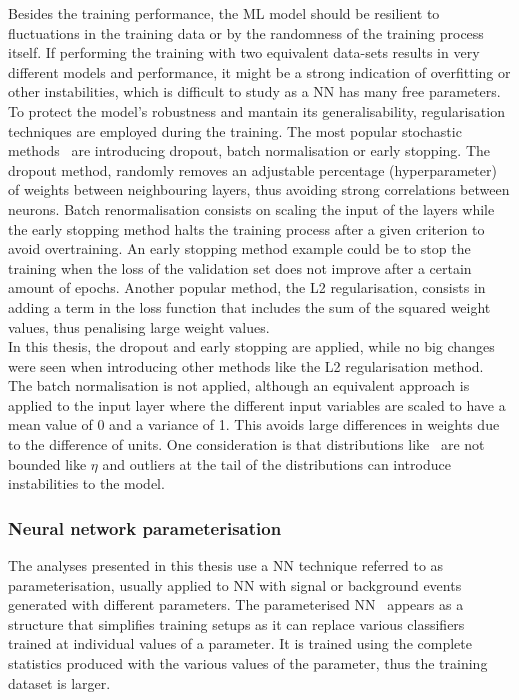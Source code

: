 Besides the training performance, the ML model should be resilient to fluctuations in the training data or by the randomness of the training process itself. If performing the training with two equivalent data-sets results in very different models and performance, it might be a strong indication of overfitting or other instabilities, which is difficult to study as a NN has many free parameters.\\

To protect the model's robustness and mantain its generalisability, regularisation techniques are employed during the training. The most popular stochastic methods~\cite{JMLR:v15:srivastava14a,batchnorm,earlystop} are introducing dropout, batch normalisation or early stopping. The dropout method, randomly removes an adjustable percentage (hyperparameter) of weights between neighbouring layers, thus avoiding strong correlations between neurons. Batch renormalisation consists on scaling the input of the layers while the early stopping method halts the training process after a given criterion to avoid overtraining. An early stopping method example could be to stop the training when the loss of the validation set does not improve after a certain amount of epochs. Another popular method, the L2 regularisation, consists in adding a term in the loss function that includes the sum of the squared weight values, thus penalising large weight values.\\

In this thesis, the dropout and early stopping are applied, while no big changes were seen when introducing other methods like the L2 regularisation method. The batch normalisation is not applied, although an equivalent approach is applied to the input layer where the different input variables are scaled to have a mean value of 0 and a variance of 1. This avoids large differences in weights due to the difference of units. One consideration is that distributions like \pT\ are not bounded like $\eta$ and outliers at the tail of the distributions can introduce instabilities to the model.

\subsubsection{Neural network parameterisation}

The analyses presented in this thesis use a NN technique referred to as parameterisation, usually applied to NN with signal or background events generated with different parameters. The parameterised NN~\cite{Baldi_2016} appears as a structure that simplifies training setups as it can replace various classifiers trained at individual values of a parameter. It is trained using the complete statistics produced with the various values of the parameter, thus the training dataset is larger.\\

